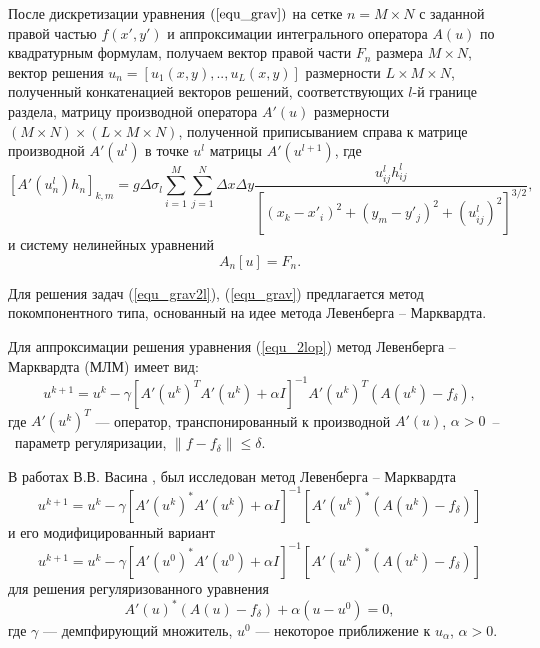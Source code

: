 После дискретизации уравнения $(\ref{equ_grav})$ на сетке $n=M\times N$ с заданной правой частью $f(x',y')$ и аппроксимации интегрального оператора $A(u)$ по квадратурным формулам, получаем вектор правой части $F_n$ размера  $M\times N$, вектор решения $u_n=[u_1(x,y),..,u_L(x,y)]$ размерности $L\times M\times N$, полученный конкатенацией векторов решений, соответствующих $l$-й границе раздела, матрицу производной оператора $A'(u)$ размерности $(M\times N)\times(L\times M\times N)$, полученной приписыванием справа к матрице производной $A'(u^l)$ в точке $u^l$ матрицы $A'(u^{l+1})$, где
\begin{equation}\label{op_grav_disc_form_mult}
[A'(u_n^l)h_n]_{k,m}=g\Delta\sigma_l\sum\limits_{i=1}^{M}\sum\limits_{j=1}^{N}
\Delta x\Delta y\frac{u^l_{ij}h^l_{ij}}{[(x_k-x'_i)^2+(y_m-y'_j)^2+(u^l_{ij})^2]^{3/2}},
\end{equation} и систему нелинейных уравнений  
\begin{equation}\label{snl_equ}
A_n[u]=F_n.
\end{equation}

Для решения задач (\ref{equ_grav2l}), (\ref{equ_grav}) предлагается метод покомпонентного типа, основанный на идее метода Левенберга -- Марквардта. 

Для аппроксимации решения уравнения (\ref{equ_2lop}) метод Левенберга -- Марквардта (МЛМ) имеет вид:
\begin{equation}
u^{k+1}=u^k-\gamma[A'(u^k)^T A'(u^k)+\alpha I]^{-1} A'(u^k)^T(A(u^k)-f_\delta),
\end{equation}
где $A'(u^k)^T$ --- оператор, транспонированный к производной $A'(u)$, $\alpha>0$~--~параметр регуляризации, $\|f-f_\delta\|\le \delta.$
 
В работах В.В. Васина \cite{Vasin_2012}, \cite{VasPer_2011} был исследован метод Левенберга -- Марквардта
\begin{equation}\label{LM_Vasin}
u^{k+1}=u^k-\gamma[A'(u^k)^*A'(u^k)+\alpha I]^{-1} [A'(u^k)^*(A(u^k)-f_\delta)]
\end{equation} и его модифицированный вариант
\begin{equation}\label{LM_modif_Vasin}
u^{k+1}=u^k-\gamma[A'(u^0)^*A'(u^0)+\alpha I]^{-1} [A'(u^k)^*(A(u^k)-f_\delta)]
\end{equation} для решения регуляризованного уравнения
$$A'(u)^*(A(u)-f_\delta)+	\alpha (u-u^0)=0,$$
где $\gamma$ --- демпфирующий множитель, $u^0$ --- некоторое приближение к $u_\alpha$, $\alpha>0$. 

